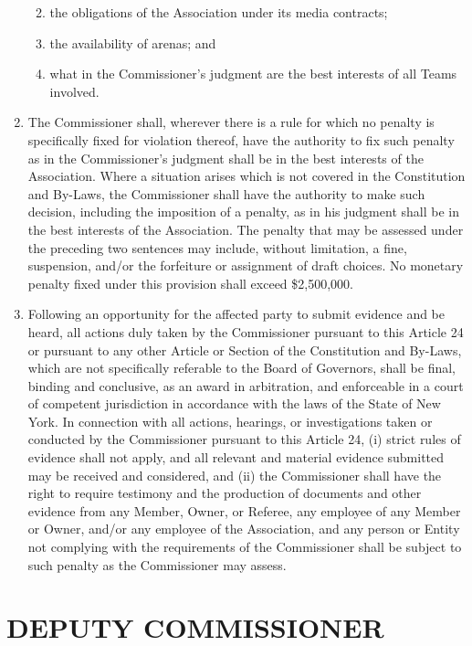 \documentclass[]{book}
\providecommand{\tightlist}{%
  \setlength{\itemsep}{0pt}\setlength{\parskip}{0pt}}
\theoremstyle{definition}
\theoremstyle{definition}
\theoremstyle{definition}
\theoremstyle{remark}
\begin{document}
\begin{enumerate}
  \begin{enumerate}
  \def\labelenumii{(\roman{enumii})}
  \tightlist
  \item
    the obligations of the Association under its media contracts;
  \item
    the availability of arenas; and
  \item
    what in the Commissioner's judgment are the best interests of all
    Teams involved.
  \end{enumerate}
\item
  The Commissioner shall, wherever there is a rule for which no penalty
  is specifically fixed for violation thereof, have the authority to fix
  such penalty as in the Commissioner's judgment shall be in the best
  interests of the Association. Where a situation arises which is not
  covered in the Constitution and By-Laws, the Commissioner shall have
  the authority to make such decision, including the imposition of a
  penalty, as in his judgment shall be in the best interests of the
  Association. The penalty that may be assessed under the preceding two
  sentences may include, without limitation, a fine, suspension, and/or
  the forfeiture or assignment of draft choices. No monetary penalty
  fixed under this provision shall exceed \$2,500,000.
\item
  Following an opportunity for the affected party to submit evidence and
  be heard, all actions duly taken by the Commissioner pursuant to this
  Article 24 or pursuant to any other Article or Section of the
  Constitution and By-Laws, which are not specifically referable to the
  Board of Governors, shall be final, binding and conclusive, as an
  award in arbitration, and enforceable in a court of competent
  jurisdiction in accordance with the laws of the State of New York. In
  connection with all actions, hearings, or investigations taken or
  conducted by the Commissioner pursuant to this Article 24, (i) strict
  rules of evidence shall not apply, and all relevant and material
  evidence submitted may be received and considered, and (ii) the
  Commissioner shall have the right to require testimony and the
  production of documents and other evidence from any Member, Owner, or
  Referee, any employee of any Member or Owner, and/or any employee of
  the Association, and any person or Entity not complying with the
  requirements of the Commissioner shall be subject to such penalty as
  the Commissioner may assess.
\end{enumerate}

\section{DEPUTY COMMISSIONER}\label{deputy-commissioner}
\end{document}

